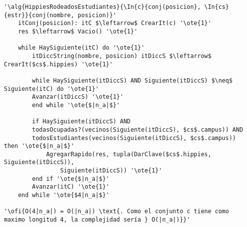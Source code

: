 \begin{lstlisting}[mathescape]
'\alg{HippiesRodeadosEstudiantes}{\In{c}{conj(posicion}, \In{cs}{estr}}{conj(nombre, posicion)}'
	itConj(posicion): itC $\leftarrow$ CrearIt(c) '\ote{1}'
	res $\leftarrow$ Vacio() '\ote{1}'

	while HaySiguiente(itC) do '\ote{1}'
		itDiccString(nombre, posicion) itDiccS $\leftarrow$ CrearIt($cs$.hippies) '\ote{1}'

		while HaySiguiente(itDiccS) AND Siguiente(itDiccS) $\neq$ Siguiente(itC) do '\ote{1}'
		Avanzar(itDiccS) '\ote{1}'
		end while '\ote{$|n_a|$}'

		if HaySiguiente(itDiccS) AND 
		todasOcupadas?(vecinos(Siguiente(itDiccS), $cs$.campus)) AND 
		todosEstudiantes(vecinos(Siguiente(itDiccS), $cs$.campus)) then '\ote{$|n_a|$}'
			AgregarRapido(res, tupla(DarClave($cs$.hippies, Siguiente(itDiccS)), 
				Siguiente(itDiccS)) '\ote{1}'
		end if '\ote{$|n_a|$}'
		Avanzar(itC) '\ote{1}'
	end while '\ote{$4|n_a|$}'

'\ofi{O(4|n_a|) = O(|n_a|) \text{. Como el conjunto c tiene como maximo longitud 4, la complejidad sería } O(|n_a|)}}'
\end{lstlisting}

